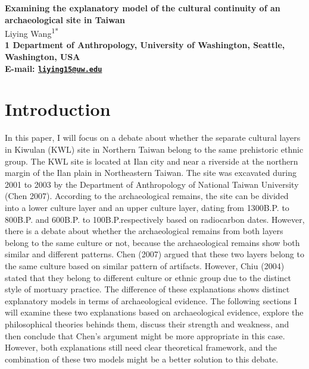 \documentclass[10pt]{article}
\date{}
\begin{document}
\begin{flushleft}
{\Large
\textbf{Examining the explanatory model of the cultural continuity of an
archaeological site in Taiwan}
}
\\
  Liying Wang\textsuperscript{1*}\\
\bf{1} Department of Anthropology, University of Washington,  Seattle,  Washington,  USA
\\

\textasteriskcentered{} E-mail:   \href{mailto:liying15@uw.edu}{\nolinkurl{liying15@uw.edu}}

\end{flushleft}

\section*{Introduction}\label{introduction}

In this paper, I will focus on a debate about whether the separate
cultural layers in Kiwulan (KWL) site in Northern Taiwan belong to the
same prehistoric ethnic group. The KWL site is located at Ilan city and
near a riverside at the northern margin of the Ilan plain in
Northeastern Taiwan. The site was excavated during 2001 to 2003 by the
Department of Anthropology of National Taiwan University (Chen 2007).
According to the archaeological remains, the site can be divided into a
lower culture layer and an upper culture layer, dating from 1300B.P. to
800B.P. and 600B.P. to 100B.P.respectively based on radiocarbon dates.
However, there is a debate about whether the archaeological remains from
both layers belong to the same culture or not, because the
archaeological remains show both similar and different patterns. Chen
(2007) argued that these two layers belong to the same culture based on
similar pattern of artifacts. However, Chiu (2004) stated that they
belong to different culture or ethnic group due to the distinct style of
mortuary practice. The difference of these explanations shows distinct
explanatory models in terms of archaeological evidence. The following
sections I will examine these two explanations based on archaeological
evidence, explore the philosophical theories behinds them, discuss their
strength and weakness, and then conclude that Chen's argument might be
more appropriate in this case. However, both explanations still need
clear theoretical framework, and the combination of these two models
might be a better solution to this debate.
\end{document}
